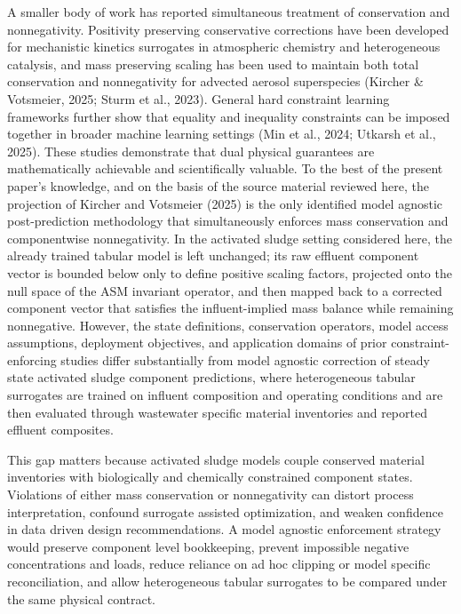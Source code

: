 \documentclass[a4paper,fleqn]{cas-sc}
\begin{document}
A smaller body of work has reported simultaneous treatment of conservation and nonnegativity. Positivity preserving conservative corrections have been developed for mechanistic kinetics surrogates in atmospheric chemistry and heterogeneous catalysis, and mass preserving scaling has been used to maintain both total conservation and nonnegativity for advected aerosol superspecies (Kircher \& Votsmeier, 2025; Sturm et al., 2023). General hard constraint learning frameworks further show that equality and inequality constraints can be imposed together in broader machine learning settings (Min et al., 2024; Utkarsh et al., 2025). These studies demonstrate that dual physical guarantees are mathematically achievable and scientifically valuable. To the best of the present paper's knowledge, and on the basis of the source material reviewed here, the projection of Kircher and Votsmeier (2025) is the only identified model agnostic post-prediction methodology that simultaneously enforces mass conservation and componentwise nonnegativity. In the activated sludge setting considered here, the already trained tabular model is left unchanged; its raw effluent component vector is bounded below only to define positive scaling factors, projected onto the null space of the ASM invariant operator, and then mapped back to a corrected component vector that satisfies the influent-implied mass balance while remaining nonnegative. However, the state definitions, conservation operators, model access assumptions, deployment objectives, and application domains of prior constraint-enforcing studies differ substantially from model agnostic correction of steady state activated sludge component predictions, where heterogeneous tabular surrogates are trained on influent composition and operating conditions and are then evaluated through wastewater specific material inventories and reported effluent composites.

This gap matters because activated sludge models couple conserved material inventories with biologically and chemically constrained component states. Violations of either mass conservation or nonnegativity can distort process interpretation, confound surrogate assisted optimization, and weaken confidence in data driven design recommendations. A model agnostic enforcement strategy would preserve component level bookkeeping, prevent impossible negative concentrations and loads, reduce reliance on ad hoc clipping or model specific reconciliation, and allow heterogeneous tabular surrogates to be compared under the same physical contract.
\end{document}
